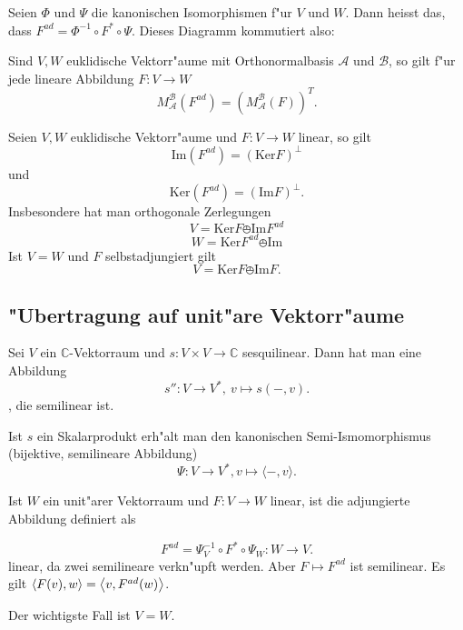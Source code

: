 \documentclass[11pt, a4paper]{article}
\begin{document}
\begin{remark}
Seien $\Phi$ und $\Psi$ die kanonischen Isomorphismen f"ur $V$ und $W$. Dann heisst das, dass $F^{ad} = 
\Phi^{-1} \circ F^{*} \circ \Psi$.
Dieses Diagramm kommutiert also:
\begin{xy}
\end{xy}

\end{remark}

\begin{remark}
Sind $V, W$ euklidische Vektorr"aume mit Orthonormalbasis $\mathcal{A}$ und $\mathcal{B}$, so gilt f"ur jede lineare Abbildung $F : V \rightarrow W$
$$
M_\mathcal{A}^\mathcal{B}(F^{ad}) = \left( M_\mathcal{A}^\mathcal{B}(F)\right)^T.
$$
\end{remark}

\begin{theorem}
Seien $V, W$ euklidische Vektorr"aume und $F : V \rightarrow W$ linear, so gilt
$$
\mathrm{Im}(F^{ad}) = (\mathrm{Ker}F)^\perp
$$
und
 $$
\mathrm{Ker}(F^{ad}) = (\mathrm{Im}F)^\perp.
$$
Insbesondere hat man orthogonale Zerlegungen
$$
V = \mathrm{Ker} F \obot \mathrm{Im}F^{ad}
$$
$$
W = \mathrm{Ker}F^{ad} \obot \mathrm{Im}
$$
Ist $V = W$ und $F$ selbstadjungiert gilt
$$
V = \mathrm{Ker}F \obot \mathrm{Im}F.
$$

\end{theorem}

\subsection{"Ubertragung auf unit"are Vektorr"aume}
\begin{definition}
Sei $V$ ein $\mathbb{C}$-Vektorraum und $s : V \times V \rightarrow \mathbb{C}$ sesquilinear.
Dann hat man eine Abbildung 
$$
s'' : V \rightarrow V^*, \ v \mapsto s(-, v).
$$
, die semilinear ist.

Ist $s$ ein Skalarprodukt erh"alt man den kanonischen Semi-Ismomorphismus (bijektive, semilineare Abbildung)
$$
\Psi : V \rightarrow V^*, v \mapsto \langle - , v \rangle.
$$

Ist $W$ ein unit"arer Vektorraum und $F : V \rightarrow W$ linear, ist die adjungierte Abbildung definiert als 

$$
F^{ad} = \Psi^{-1}_V \circ F^* \circ \Psi_W  : W \rightarrow V.
$$
linear, da zwei semilineare verkn"upft werden.
Aber $ F \mapsto F^{ad}$ ist semilinear.
Es gilt $\langle F(v), w \rangle = \scp{v}{F^{ad}(w)}$.

Der wichtigste Fall ist $V = W$.
\end{definition}
\end{document}
